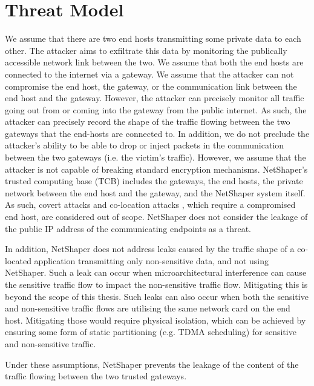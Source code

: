 \section{Threat Model}
\label{sec:netshaper-threat-model}

We assume that there are two end hosts transmitting some private data to each other.
The attacker aims to exfiltrate this data by monitoring the publically accessible network link between the two.
We assume that both the end hosts are connected to the internet via a gateway.
We assume that the attacker can not compromise the end host, the gateway, or the communication link between the end host and the gateway.
However, the attacker can precisely monitor all traffic going out from or coming into the gateway from the public internet. 
As such, the attacker can precisely record the shape of the traffic flowing between the two gateways that the end-hosts are connected to.
In addition, we do not preclude the attacker's ability to be able to drop or inject packets in the communication between the two gateways (i.e. the victim's traffic).
However, we assume that the attacker is not capable of breaking standard encryption mechanisms.
NetShaper's trusted computing base (TCB) includes the gateways, the end hosts, the private network between the end host and the gateway, and the NetShaper system itself.
As such, covert attacks \cite{zhang2011predinteractive} and co-location attacks \cite{schuster2017beautyburst,mehta2022pacer}, which require a compromised end host, are considered out of scope.
NetShaper does not consider the leakage of the public IP address of the communicating endpoints as a threat.

In addition, NetShaper does not address leaks caused by the traffic shape of a co-located application transmitting only non-sensitive data, and not using NetShaper.
Such a leak can occur when microarchitectural interference can cause the sensitive traffic flow to impact the non-sensitive traffic flow. Mitigating this is beyond the scope of this thesis.
Such leaks can also occur when both the sensitive and non-sensitive traffic flows are utilising the same network card on the end host.
Mitigating those would require physical isolation, which can be achieved by ensuring some form of static partitioning (e.g. TDMA scheduling) for sensitive and non-sensitive traffic.

Under these assumptions, NetShaper prevents the leakage of the content of the traffic flowing between the two trusted gateways.